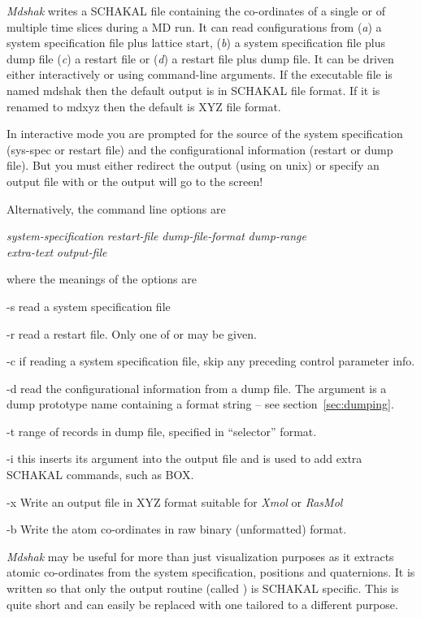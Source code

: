 \documentclass[a4paper,twoside]{report}
\newcommand{\Fname}[1]{{\upshape\mdseries\sffamily#1}}
\begin{document}
\emph{Mdshak} writes a SCHAKAL file containing the co-ordinates of a
single or of multiple time slices during a MD run.  It can read
configurations from (\emph{a}) a system specification file plus
lattice start, (\emph{b}) a system specification file plus dump file
(\emph{c}) a restart file or (\emph{d}) a restart file plus dump file.
It can be driven either interactively or using command-line arguments.
If the executable file is named \Fname{mdshak} then the default output
is in SCHAKAL file format. If it is renamed to \Fname{mdxyz} then the
default is XYZ file format.  

In interactive mode you are prompted for the source of the system
specification (sys-spec or restart file) and the configurational
information (restart or dump file).  But you must either redirect the
output (using \Lit{>} on unix) or specify an output file with 
or the output will go to the screen!

Alternatively, the command line options are
\begin{center}
\Lit{[-s} \textit{system-specification} \Lit{]|}%
\Lit{[-r} \textit{restart-file} \Lit{]}
\Lit{[-d} \textit{dump-file-format} \Lit{]}
\Lit{[-t} \textit{dump-range} \Lit{]} \\
\Lit{[-c]}
\Lit{[-x]|[-b]}
\Lit{[-i} \textit{extra-text} \Lit{]}
\Lit{[-o} \textit{output-file} \Lit{]}
\end{center}
where the meanings of the options are
\begin{list}{}{\let\makelabel\ttlabel\itemsep=0pt\parsep=3pt\leftmargin=1.5cm}
\item[-s] read a system specification file
\item[-r] read a restart file.  Only one of  or  may
be given.
\item[-c] if reading a system specification file, skip any preceding
control parameter info.
\item[-d] read the configurational information from a dump file.  The
argument is a dump prototype name containing a  format
string -- see section~\ref{sec:dumping}.
\item[-t] range of records in dump file, specified in ``selector''
format.
\item[-i]   this inserts its argument into the output file and is used
to add extra SCHAKAL commands, such as BOX.
\item[-x] Write an output file in XYZ format suitable for \emph{Xmol}
  or \emph{RasMol}
\item[-b] Write the atom co-ordinates in raw binary (unformatted) format.
\end{list}

\emph{Mdshak} may be useful for more than just visualization purposes
as it extracts atomic co-ordinates from the system specification,
positions and quaternions.  It is written so that only the output routine
(called ) is SCHAKAL specific.  This is quite
short and can easily be replaced with one tailored to a different
purpose.



\end{document}
